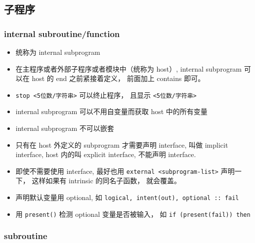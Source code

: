 \subsection{子程序}
\subsubsection{internal subroutine/function}
\begin{itemize}
\item 统称为 internal subprogram
\item 在主程序或者外部子程序或者模块中（统称为 host）, internal subprogram 可以在 host 的 end 之前紧接着定义， 前面加上 contains 即可。
\item \verb`stop <5位数/字符串>` 可以终止程序， 且显示 \verb`<5位数/字符串>`
\item internal subprogram 可以不用自变量而获取 host 中的所有变量
\item internal subprogram 不可以嵌套
\item 只有在 host 外定义的 subprogram 才需要声明 interface, 叫做 implicit interface, host 内的叫 explicit interface, 不能声明 interface.
\item 即使不需要使用 interface, 最好也用 \verb`external <subprogram-list>` 声明一下， 这样如果有 intrinsic 的同名子函数， 就会覆盖。
\item 声明默认变量用 optional, 如 \verb`logical, intent(out), optional :: fail`
\item 用 \verb`present()` 检测 optional 变量是否被输入， 如 \verb`if (present(fail)) then`
\end{itemize}

\subsubsection{subroutine}


